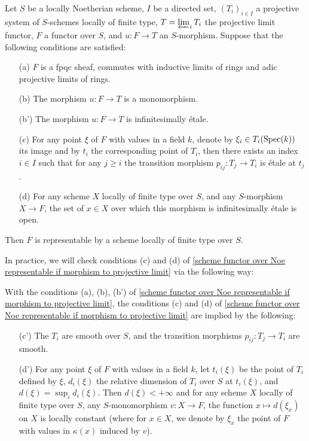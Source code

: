 \begin{proposition}\label{scheme functor over Noe representable if morphism to projective limit}
Let $S$ be a locally Noetherian scheme, $I$ be a directed set, $(T_i)_{i\in I}$ a projective system of $S$-schemes locally of finite type, $T=\varprojlim_iT_i$ the projective limit functor, $F$ a functor over $S$, and $u:F\to T$ an $S$-morphism. Suppose that the following conditions are satisfied:
\begin{enumerate}
    \item[(a)] $F$ is a fpqc sheaf, commutes with inductive limits of rings and adic projective limits of rings.
    \item[(b)] The morphism $u:F\to T$ is a monomorphism.
    \item[(b')] The morphism $u:F\to T$ is infinitesimally \'etale.
    \item[(c)] For any point $\xi$ of $F$ with values in a field $k$, denote by $\xi_i\in T_i(\mathrm{Spec}(k))$ its image and by $t_i$ the corresponding point of $T_i$, then there exists an index $i\in I$ such that for any $j\geq i$ the transition morphism $p_{ij}:T_j\to T_i$ is \'etale at $t_j$.
    \item[(d)] For any scheme $X$ locally of finite type over $S$, and any $S$-morphism $X\to F$, the set of $x\in X$ over which this morphism is infinitesimally \'etale is open. 
\end{enumerate}
Then $F$ is representable by a scheme locally of finite type over $S$.
\end{proposition}

In practice, we will check conditions (c) and (d) of \cref{scheme functor over Noe representable if morphism to projective limit} via the following way:

\begin{corollary}\label{scheme functor over Noe representable if morphism to projective limit condition verify}
With the conditions (a), (b), (b') of \cref{scheme functor over Noe representable if morphism to projective limit}, the conditions (c) and (d) of \cref{scheme functor over Noe representable if morphism to projective limit} are implied by the following:
\begin{enumerate}
    \item[(c')] The $T_i$ are smooth over $S$, and the transition morphisms $p_{ij}:T_j\to T_i$ are smooth.
    \item[(d')] For any point $\xi$ of $F$ with values in a field $k$, let $t_i(\xi)$ be the point of $T_i$ defined by $\xi$, $d_i(\xi)$ the relative dimension of $T_i$ over $S$ at $t_i(\xi)$, and $d(\xi)=\sup_id_i(\xi)$. Then $d(\xi)<+\infty$ and for any scheme $X$ locally of finite type over $S$, any $S$-monomorphism $v:X\to F$, the function $x\mapsto d(\xi_x)$ on $X$ is locally constant (where for $x\in X$, we denote by $\xi_x$ the point of $F$ with values in $\kappa(x)$ induced by $v$). 
\end{enumerate}
\end{corollary}


